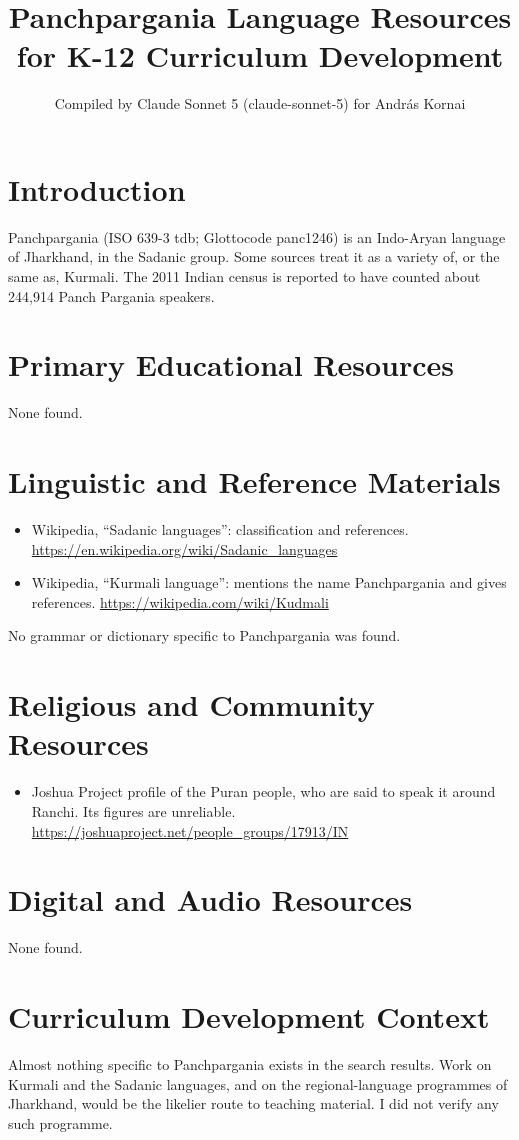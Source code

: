 \documentclass[12pt]{article}
\title{Panchpargania Language Resources for K-12 Curriculum Development}
\author{Compiled by Claude Sonnet 5 (claude-sonnet-5) for Andr\'as Kornai}
\date{}
\begin{document}
\maketitle

\section{Introduction}
Panchpargania (ISO 639-3 tdb; Glottocode panc1246) is an Indo-Aryan language of Jharkhand, in the Sadanic group. Some sources treat it as a variety of, or the same as, Kurmali. The 2011 Indian census is reported to have counted about 244,914 Panch Pargania speakers.

\section{Primary Educational Resources}
None found.

\section{Linguistic and Reference Materials}
\begin{itemize}
\item Wikipedia, ``Sadanic languages'': classification and references. \url{https://en.wikipedia.org/wiki/Sadanic_languages}
\item Wikipedia, ``Kurmali language'': mentions the name Panchpargania and gives references. \url{https://wikipedia.com/wiki/Kudmali}
\end{itemize}
No grammar or dictionary specific to Panchpargania was found.

\section{Religious and Community Resources}
\begin{itemize}
\item Joshua Project profile of the Puran people, who are said to speak it around Ranchi. Its figures are unreliable. \url{https://joshuaproject.net/people_groups/17913/IN}
\end{itemize}

\section{Digital and Audio Resources}
None found.

\section{Curriculum Development Context}
Almost nothing specific to Panchpargania exists in the search results. Work on Kurmali and the Sadanic languages, and on the regional-language programmes of Jharkhand, would be the likelier route to teaching material. I did not verify any such programme.
\end{document}
